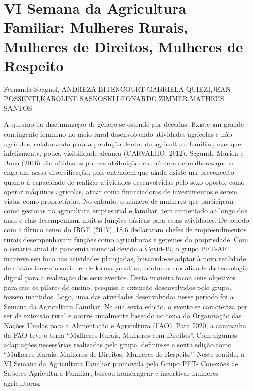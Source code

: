 

\section{VI Semana da Agricultura Familiar: Mulheres Rurais, Mulheres de Direitos, Mulheres de Respeito}

Fernanda Spagnol, ANDREZA BITENCOURT,GABRIELA QUIEZI,JEAN POSSENTI,KAROLINE SASKOSKI,LEONARDO ZIMMER,MATHEUS SANTOS

A questão da discriminação de gênero se estende por décadas. Existe um grande 
contingente feminino no meio rural desenvolvendo atividades agrícolas e não agrícolas, 
colaborando para a produção dentro da agricultura familiar, mas que infelizmente, pouca 
visibilidade alcança (CARVALHO, 2012).
Segundo Marion e Bona (2016) são nítidas as poucas atribuições e o número de mulheres 
que se engajam nessa diversificação, pois entendem que ainda existe um preconceito quanto à 
capacidade de realizar atividades desenvolvidas pelo sexo oposto, como operar máquinas 
agrícolas, atuar como financiadoras de investimentos e serem vistas como proprietárias.
No entanto, o número de mulheres que participam como gestoras na agricultura empresarial 
e familiar, tem aumentado ao longo dos anos e elas desempenham muitas funções básicas para 
essas atividades. De acordo com o último censo do IBGE (2017), 18,6%
declararam chefes de empreendimentos rurais desempenhavam funções como agricultoras e 
gerentes da propriedade.
Com o cenário atual da pandemia mundial devido à Covid-19, o grupo PET-AF manteve 
seu foco nas atividades planejadas, buscando-se adptar à nova realidade de distânciamento social 
e, de forma proativa, adotou a modalidade da tecnologia digital para a realização dos seus eventos. 
Desta maneira focou seus objetivos para que os pilares de ensino, pesquisa e extensão 
desenvolvidos pelo grupo, fossem mantidos.
Logo, uma das atividades desenvolvidas nesse período foi a Semana da Agricultura 
Familiar. Na sua sexta edição, o evento se caracteriza por ser de extensão rural e ocorre 
anualmente baseado no tema da Organização das Nações Unidas para a Alimentação e Agricultura 
(FAO). Para 2020, a campanha da FAO teve o tema “Mulheres Rurais, Mulheres com Direitos”.
Com algumas adaptações necessárias realizadas pelo grupo, definiu-se a sexta edição como 
“Mulheres Rurais, Mulheres de Direitos, Mulheres de Respeito”.
Neste sentido, a VI Semana da Agricultura Familiar promovida pelo Grupo PET- Conexões 
de Saberes Agricultura Familiar, buscou homenagear e incentivar mulheres agricultoras, 

